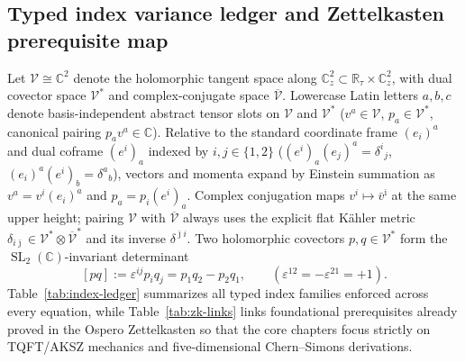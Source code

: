 \documentclass[11pt,letterpaper]{article}
\numberwithin{equation}{section}
\theoremstyle{plain}
\theoremstyle{definition}
\theoremstyle{remark}
\newcommand{\SL}{\operatorname{SL}}
\begin{document}
\subsection{Typed index variance ledger and Zettelkasten prerequisite map}
\label{subsec:summary-ledger}

Let $\mathcal{V} \cong \mathbb{C}^2$ denote the holomorphic tangent space along $\mathbb{C}^2_z \subset \mathbb{R}_\tau \times \mathbb{C}^2_z$, with dual covector space $\mathcal{V}^*$ and complex-conjugate space $\overline{\mathcal{V}}$. Lowercase Latin letters $a,b,c$ denote basis-independent abstract tensor slots on $\mathcal{V}$ and $\mathcal{V}^*$ ($v^a \in \mathcal{V}$, $p_a \in \mathcal{V}^*$, canonical pairing $p_a v^a \in \mathbb{C}$). Relative to the standard coordinate frame $(e_i)^a$ and dual coframe $(e^i)_a$ indexed by $i,j \in \{1,2\}$ ($(e^i)_a(e_j)^a = \delta^i{}_j$, $(e_i)^a(e^i)_b = \delta^a{}_b$), vectors and momenta expand by Einstein summation as $v^a = v^i(e_i)^a$ and $p_a = p_i(e^i)_a$. Complex conjugation maps $v^i \mapsto \bar{v}^{\bar{\imath}}$ at the same upper height; pairing $\mathcal{V}$ with $\overline{\mathcal{V}}$ always uses the explicit flat K\"ahler metric $\delta_{i\bar{\jmath}} \in \mathcal{V}^*\otimes\overline{\mathcal{V}}^*$ and its inverse $\delta^{\bar{\jmath}i}$. Two holomorphic covectors $p, q \in \mathcal{V}^*$ form the $\SL_2(\mathbb{C})$-invariant determinant
\begin{equation}
\label{eq:det-bracket}
[pq] := \varepsilon^{ij} p_i q_j = p_1 q_2 - p_2 q_1, \qquad (\varepsilon^{12} = -\varepsilon^{21} = +1).
\end{equation}
Table~\ref{tab:index-ledger} summarizes all typed index families enforced across every equation, while Table~\ref{tab:zk-links} links foundational prerequisites already proved in the Ospero Zettelkasten so that the core chapters focus strictly on TQFT/AKSZ mechanics and five-dimensional Chern--Simons derivations.
\end{document}
